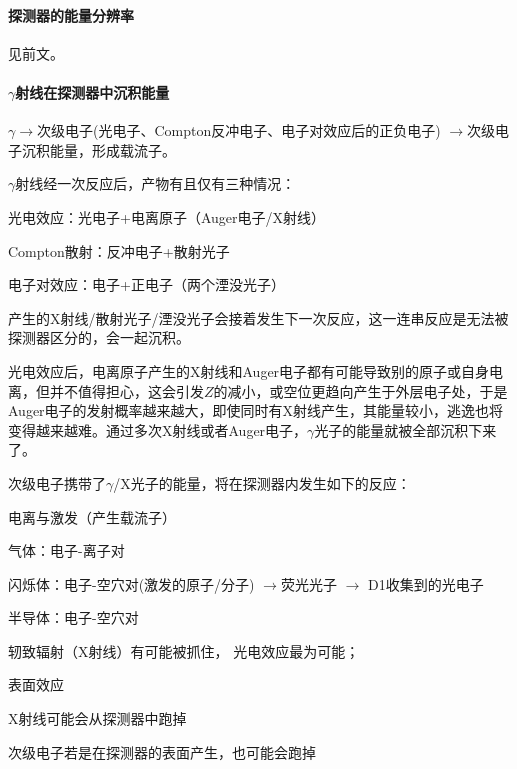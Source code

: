 \paragraph{探测器的能量分辨率}见前文。
\paragraph{$\gamma$射线在探测器中沉积能量}
$\gamma\to$次级电子(光电子、Compton反冲电子、电子对效应后的正负电子) $\to$次级电子沉积能量，形成载流子。

$\gamma$射线经一次反应后，产物有且仅有三种情况：
\begin{compactitem}
	\item 光电效应：光电子+电离原子（Auger电子/X射线）
	\item Compton散射：反冲电子+散射光子
	\item 电子对效应：电子+正电子（两个湮没光子）
\end{compactitem}
产生的X射线/散射光子/湮没光子会接着发生下一次反应，这一连串反应是无法被探测器区分的，会一起沉积。

光电效应后，电离原子产生的X射线和Auger电子都有可能导致别的原子或自身电离，但并不值得担心，这会引发$Z$的减小，或空位更趋向产生于外层电子处，于是Auger电子的发射概率越来越大，即使同时有X射线产生，其能量较小，逃逸也将变得越来越难。通过多次X射线或者Auger电子，$\gamma$光子的能量就被全部沉积下来了。

次级电子携带了$\gamma$/X光子的能量，将在探测器内发生如下的反应：
\begin{compactitem}
	\item 电离与激发（产生载流子）
	\begin{compactitem}
		\item 气体：电子-离子对
		\item 闪烁体：电子-空穴对(激发的原子/分子) $\to$荧光光子%
		$\to$ D1收集到的光电子
		\item 半导体：电子-空穴对
	\end{compactitem}
	\item 轫致辐射（X射线）有可能被抓住，
	光电效应最为可能；
	\item 表面效应
	\begin{compactitem}
		\item X射线可能会从探测器中跑掉
		\item 次级电子若是在探测器的表面产生，也可能会跑掉
	\end{compactitem}
\end{compactitem}
